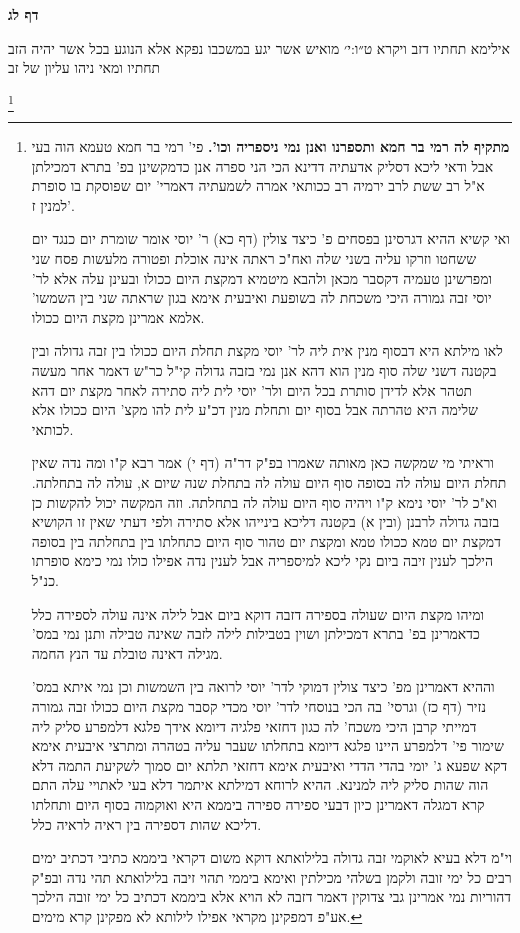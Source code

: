 \documentclass[12pt, openany]{book}
\newcommand{\sethebfont}{
\fontsize{10.5pt}{21.0pt} \selectfont
}
\newcommand{\twocol}[1]{
	{\sethebfont \begin{multicols}{2}
			#1
	\end{multicols}}	
}
\newcommand{\sectname}{}
\newcommand{\newsection}[1]{
	\addcontentsline{toc}{section}{#1}
	\renewcommand{\sectname}{#1}	
	\vspace{-\baselineskip}
	\begin{center}
		\textbf{%
\fontsize{16pt}{16pt}\selectfont
			#1}
	\end{center}
	\vspace{-\baselineskip}
	\nopagebreak
}
\newcommand{\footnotecomment}[1]{
	\renewcommand\thefootnote{}
	\footnote{#1}}
\newcommand{\commenta}[1]{\footnotecomment{#1}}
\begin{document}
\newsection{דף לג}
\twocol{אילימא תחתיו דזב {ויקרא ט״ו:י׳ } מואיש אשר יגע במשכבו נפקא אלא הנוגע בכל אשר יהיה הזב תחתיו ומאי ניהו עליון של זב
\commenta{\textbf{מתקיף לה רמי בר חמא ותספרנו ואנן נמי ניספריה וכו'.} פי' רמי בר חמא טעמא הוה בעי אבל ודאי ליכא דסליק אדעתיה דדינא הכי הני ספרה אנן כדמקשינן בפ' בתרא דמכילתן א"ל רב ששת לרב ירמיה רב ככותאי אמרה לשמעתיה דאמרי' יום שפוסקת בו סופרת למנין ז'.\par ואי קשיא ההיא דגרסינן בפסחים פ' כיצד צולין (דף כא) ר' יוסי אומר שומרת יום כנגד יום ששחטו וזרקו עליה בשני שלה ואח"כ ראתה אינה אוכלת ופטורה מלעשות פסח שני ומפרשינן טעמיה דקסבר מכאן ולהבא מיטמיא דמקצת היום ככולו ובעינן עלה אלא לר' יוסי זבה גמורה היכי משכחת לה בשופעת ואיבעית אימא בגון שראתה שני בין השמשו' אלמא אמרינן מקצת היום ככולו.\par לאו מילתא היא דבסוף מנין אית ליה לר' יוסי מקצת תחלת היום ככולו בין זבה גדולה ובין בקטנה דשני שלה סוף מנין הוא דהא אנן נמי בזבה גדולה קי"ל כר"ש דאמר אחר מעשה תטהר אלא לדידן סותרת בכל היום ולר' יוסי לית ליה סתירה לאחר מקצת יום דהא שלימה היא טהרתה אבל בסוף יום ותחלת מנין דכ"ע לית להו מקצ' היום ככולו אלא לכותאי.\par וראיתי מי שמקשה כאן מאותה שאמרו בפ"ק דר"ה (דף י) אמר רבא ק"ו ומה נדה שאין תחלת היום עולה לה בסופה סוף היום עולה לה בתחלת שנה שיום א, עולה לה בתחלתה. וא"כ לר' יוסי נימא ק"ו ויהיה סוף היום עולה לה בתחלתה. וזה המקשה יכול להקשות כן בזבה גדולה לרבנן (ובין א) בקטנה דליכא בינייהו אלא סתירה ולפי דעתי שאין זו הקושיא דמקצת יום טמא ככולו טמא ומקצת יום טהור סוף היום כתחלתו בין בתחלתה בין בסופה הילכך לענין זיבה ביום נקי ליכא למיספריה אבל לענין נדה אפילו כולו נמי כימא סופרתו כנ"ל.\par ומיהו מקצת היום שעולה בספירה דזבה דוקא ביום אבל לילה אינה עולה לספירה כלל כדאמרינן בפ' בתרא דמכילתן ושוין בטבילות לילה לזבה שאינה טבילה ותנן נמי במס' מגילה דאינה טובלת עד הנץ החמה.\par וההיא דאמרינן מפ' כיצד צולין דמוקי לדר' יוסי לרואה בין השמשות וכן נמי איתא במס' נזיר (דף כז) וגרסי' בה הכי בנוסחי לדר' יוסי מכדי קסבר מקצת היום ככולו זבה גמורה דמייתי קרבן היכי משכח' לה כגון דחזאי פלגיה דיומא אידך פלגא דלמפרע סליק ליה שימור פי' דלמפרע היינו פלגא דיומא בתחלתו שעבר עליה בטהרה ומתרצי איבעית אימא דקא שפעא ג' יומי בהדי הדדי ואיבעית אימא דחזאי תלתא יום סמוך לשקיעת התמה דלא הוה שהות סליק ליה למנינא. ההיא לרוחא דמילתא איתמר דלא בעי לאתויי עלה התם קרא דמגלה דאמרינן כיון דבעי ספירה ספירה ביממא היא ואוקמוה בסוף היום ותחלתו דליכא שהות דספירה בין ראיה לראיה כלל.\par וי"מ דלא בעיא לאוקמי זבה גדולה בלילואתא דוקא משום דקראי ביממא כתיבי דכתיב ימים רבים כל ימי זובה ולקמן בשלהי מכילתין ואימא ביממי תהוי זיבה בלילואתא תהי נדה ובפ"ק דהוריות נמי אמרינן גבי צדוקין דאמר דזבה לא הויא אלא ביממא דכתיב כל ימי זובה הילכך אע"פ דמפקינן מקראי אפילו לילותא לא מפקינן קרא מימים. }
}
\end{document}
